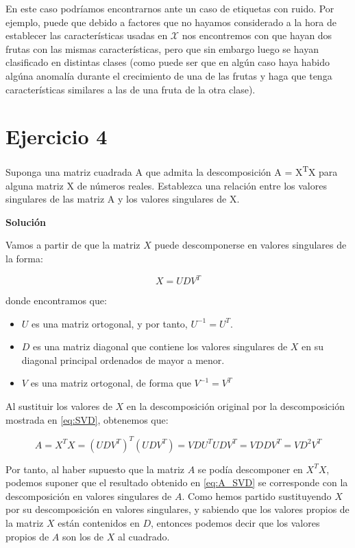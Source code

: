\documentclass[11pt,a4paper]{article}
\newcommand{\answer}{\noindent\textbf{Solución}}
\begin{document}
En este caso podríamos encontrarnos ante un caso de etiquetas con ruido. Por ejemplo, puede que debido a factores que no
hayamos considerado a la hora de establecer las características usadas en $\mathcal{X}$ nos encontremos con que hayan dos
frutas con las mismas características, pero que sin embargo luego se hayan clasificado en distintas clases (como puede ser
que en algún caso haya habido algúna anomalía durante el crecimiento de una de las frutas y haga que tenga características
similares a las de una fruta de la otra clase).

\section*{Ejercicio 4}

\noindent Suponga una matriz cuadrada A que admita la descomposición A = X\textsuperscript{T}X para alguna matriz X de
números reales. Establezca una relación entre los valores singulares de las matriz A y los valores singulares de X.

\answer

Vamos a partir de que la matriz $X$ puede descomponerse en valores singulares de la forma:

\begin{equation}
\label{eq:SVD}
	X = UDV^T
\end{equation}

\noindent donde encontramos que:

\begin{itemize}[label=\textbullet]
	\item $U$ es una matriz ortogonal, y por tanto, $U^{-1} = U^T$.
	\item $D$ es una matriz diagonal que contiene los valores singulares de $X$ en su diagonal principal ordenados de mayor
	a menor.
	\item $V$ es una matriz ortogonal, de forma que $V^{-1} = V^T$
\end{itemize}

Al sustituir los valores de $X$ en la descomposición original por la descomposición mostrada en \eqref{eq:SVD}, obtenemos que:

\begin{equation}
\label{eq:A_SVD}
	A = X^TX = (UDV^T)^T(UDV^T) = VDU^TUDV^T = VDDV^T = VD^2V^T
\end{equation}

Por tanto, al haber supuesto que la matriz $A$ se podía descomponer en $X^TX$, podemos suponer que el resultado obtenido en
\eqref{eq:A_SVD} se corresponde con la descomposición en valores singulares de $A$. Como hemos partido sustituyendo $X$ por su
descomposición en valores singulares, y sabiendo que los valores propios de la matriz $X$ están contenidos en $D$, entonces
podemos decir que los valores propios de $A$ son los de $X$ al cuadrado.
\end{document}
